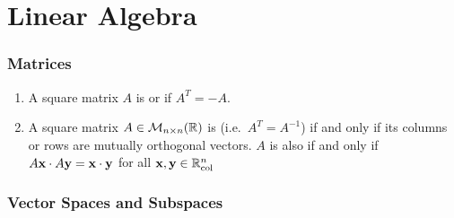 \documentclass{styles/note}
\author{Jiaming (George) Yu}
\date{\today}
\begin{document}
\maketitle
\tableofcontents
\newpage



\part{Linear Algebra}

\section{Matrices}
  
  \begin{enumerate}[label=(\alph*)]
    \item A square matrix $A$ is  or  if $A^T = -A$.
    \item A square matrix $A \in \mathcal{M}_{n\times n}(\mathbb{R})$ is  (i.e.~$A^T = A^{-1}$) if and only if its columns or rows are mutually orthogonal vectors. $A$ is also  if and only if $A\vb{x} \cdot A\vb{y} = \vb{x} \cdot \vb{y}$ for all $\vb{x}, \vb{y} \in \mathbb{R}_\mathrm{col}^{n}$
  \end{enumerate}


\section{Vector Spaces and Subspaces}
  
\end{document}
